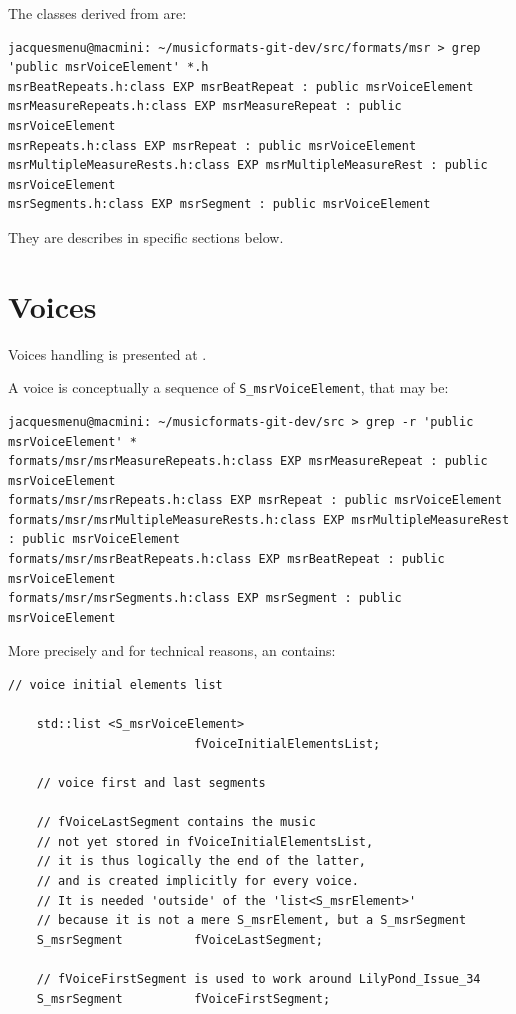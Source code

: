 The classes derived from  are:
\begin{lstlisting}[language=Terminal]
jacquesmenu@macmini: ~/musicformats-git-dev/src/formats/msr > grep 'public msrVoiceElement' *.h
msrBeatRepeats.h:class EXP msrBeatRepeat : public msrVoiceElement
msrMeasureRepeats.h:class EXP msrMeasureRepeat : public msrVoiceElement
msrRepeats.h:class EXP msrRepeat : public msrVoiceElement
msrMultipleMeasureRests.h:class EXP msrMultipleMeasureRest : public msrVoiceElement
msrSegments.h:class EXP msrSegment : public msrVoiceElement
\end{lstlisting}

They are describes in specific sections below.


\section{Voices}\label{Voices}

Voices handling is presented at .

A voice is conceptually a sequence of {\tt S_msrVoiceElement}, that may be:
\begin{lstlisting}[language=Terminal]
jacquesmenu@macmini: ~/musicformats-git-dev/src > grep -r 'public msrVoiceElement' *
formats/msr/msrMeasureRepeats.h:class EXP msrMeasureRepeat : public msrVoiceElement
formats/msr/msrRepeats.h:class EXP msrRepeat : public msrVoiceElement
formats/msr/msrMultipleMeasureRests.h:class EXP msrMultipleMeasureRest : public msrVoiceElement
formats/msr/msrBeatRepeats.h:class EXP msrBeatRepeat : public msrVoiceElement
formats/msr/msrSegments.h:class EXP msrSegment : public msrVoiceElement
\end{lstlisting}

More precisely and for technical reasons, an  contains:
\begin{lstlisting}[language=CPlusPlus]
    // voice initial elements list

    std::list <S_msrVoiceElement>
                          fVoiceInitialElementsList;

    // voice first and last segments

    // fVoiceLastSegment contains the music
    // not yet stored in fVoiceInitialElementsList,
    // it is thus logically the end of the latter,
    // and is created implicitly for every voice.
    // It is needed 'outside' of the 'list<S_msrElement>'
    // because it is not a mere S_msrElement, but a S_msrSegment
    S_msrSegment          fVoiceLastSegment;

    // fVoiceFirstSegment is used to work around LilyPond_Issue_34
    S_msrSegment          fVoiceFirstSegment;
\end{lstlisting}

